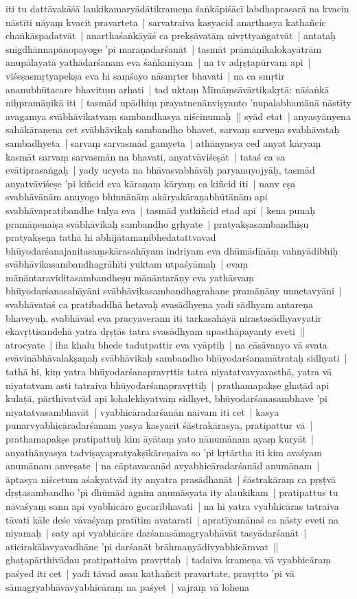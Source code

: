 \documentclass[article,12pt,a4paper]{memoir}%
\newcounter{parCount}
\begin{document}
	  \pstart \leavevmode%
	iti tu dattāvakāśā laukikamaryādātikrameṇa śaṅkāpiśācī labdhaprasarā na kvacin nāstīti nāyaṃ kvacit pravarteta | sarvatraiva kasyacid anarthasya kathañcic chaṅkāspadatvāt | anarthaśaṅkāyāś ca prekṣāvatāṃ nivṛttyaṅgatvāt | antataḥ snigdhānnapānopayoge 'pi maraṇadarśanāt | tasmāt prāmāṇikalokayātrām anupālayatā yathādarśanam eva śaṅkanīyam | na tv adṛṣṭapūrvam api | viśeṣasmṛtyapekṣa eva hi saṃśayo nāsmṛter bhavati | na ca smṛtir ananubhūtacare bhavitum arhati | tad uktaṃ Mīmāṃsāvārtikakṛtā: nāśaṅkā niḥpramāṇikā iti | tasmād upādhiṃ prayatnenānviṣyanto 'nupalabhamānā nāstīty avagamya svābhāvikatvaṃ sambandhasya niścinumaḥ || \label{thakur75-107.16} syād etat | anyasyānyena sahākāraṇena cet svābhāvikaḥ sambandho bhavet, sarvaṃ sarveṇa svabhāvataḥ sambadhyeta | sarvaṃ sarvasmād gamyeta | athānyasya ced anyat kāryaṃ kasmāt sarvaṃ sarvasmān na bhavati, anyatvāviśeṣāt | tataś ca sa evātiprasaṅgaḥ | yady ucyeta na bhāvasvabhāvāḥ paryanuyojyāḥ, tasmād anyatvāviśeṣe 'pi kiñcid eva kāraṇaṃ kāryaṃ ca kiñcid iti | nanv eṣa svabhāvānām anuyogo bhinnānāṃ akāryakāraṇabhūtānām api svabhāvapratibandhe tulya eva | tasmād yatkiñcid etad api | kena punaḥ pramāṇenaiṣa svābhāvikaḥ sambandho gṛhyate | pratyakṣasambandhiṣu pratyakṣeṇa tathā hi abhijātamaṇibhedatattvavad bhūyodarśanajanitasaṃskārasahāyam indriyam eva dhūmādīnāṃ vahnyādibhiḥ svābhāvikasambandhagrāhīti yuktam utpaśyāmaḥ | evaṃ mānāntaraviditasambandheṣu mānāntarāṇy eva yathāsvaṃ bhūyodarśanasahāyāni svābhāvikasambandhagrahaṇe pramāṇāny unnetavyāni | svabhāvataś ca pratibaddhā hetavaḥ svasādhyena yadi sādhyam antareṇa bhaveyuḥ, svabhāvād eva pracyaverann iti tarkasahāyā nirastasādhyavyatir ekavṛttisandehā yatra dṛṣṭās tatra svasādhyam upasthāpayanty eveti || \label{thakur75-108.3} atrocyate | iha khalu bhede tadutpattir eva vyāptiḥ | na cāsāvanyo vā svata evāvinābhāvalakṣaṇaḥ svābhāvikaḥ sambandho bhūyodarśanamātrataḥ sidhyati | tathā hi, kiṃ yatra bhūyodarśanapravṛttis tatra niyatatvavyavasthā, yatra vā niyatatvam asti tatraiva bhūyodarśanapravṛttiḥ | prathamapakṣe ghaṭād api kulaṭā, pārthivatvād api lohalekhyatvaṃ sidhyet, bhūyodarśanasambhave 'pi niyatatvasambhavāt | \label{thakur75-108.8} vyabhicāradarśanān naivam iti cet | kasya punarvyabhicāradarśanam yasya kasyacit śāstrakārasya, pratipattur vā | prathamapakṣe pratipattuḥ kim āyātaṃ yato nānumānam ayaṃ kuryāt | anyathānyasya tadviṣayapratyakṣīkāreṇaiva so 'pi kṛtārtha iti kim avaśyam anumānam anveṣate | na cāptavacanād avyabhicāradarśanād anumānam | āptasya niścetum aśakyatvād ity anyatra prasādhanāt | śāstrakāraṃ ca pṛṣṭvā dṛṣṭasambandho 'pi dhūmād agnim anumāsyata ity alaukikam | pratipattus tu nāvaśyaṃ sann api vyabhicāro gocarībhavati | na hi yatra vyabhicāras tatraiva tāvati kāle deśe vāvaśyaṃ pratītim avatarati | apratīyamānaś ca nāsty eveti na niyamaḥ | saty api vyabhicāre darśanasāmagryabhāvāt tasyādarśanāt | aticirakālavyavadhāne 'pi darśanāt brāhmaṇyādivyabhicāravat || \label{thakur75-108.18} ghaṭapārthivādau pratipattaiva pravṛttaḥ | tadaiva krameṇa vā vyabhicāraṃ paśyed iti cet | yadi tāvad asau kathañcit pravartate, pravṛtto 'pi vā sāmagryabhāvāvyabhicāraṃ na paśyet | vajraṃ vā lohena 
\end{document}
